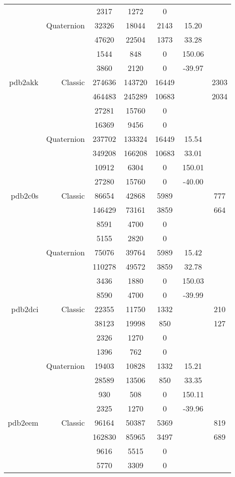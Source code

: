 \begin{xltabular}{\textwidth}{r|rcccSc}
& & 2317 & 1272 & 0 & & \\
& Quaternion & 32326 & 18044 & 2143 & 15.20 & \\
& & 47620 & 22504 & 1373 & 33.28 & \\
& & 1544 & 848 & 0 & 150.06 & \\
& & 3860 & 2120 & 0 & -39.97 & \\ \addlinespace
pdb2akk & Classic & 274636 & 143720 & 16449 & & 2303 \\
& & 464483 & 245289 & 10683 & & 2034 \\
& & 27281 & 15760 & 0 & & \\
& & 16369 & 9456 & 0 & & \\
& Quaternion & 237702 & 133324 & 16449 & 15.54 & \\
& & 349208 & 166208 & 10683 & 33.01 & \\
& & 10912 & 6304 & 0 & 150.01 & \\
& & 27280 & 15760 & 0 & -40.00 & \\ \addlinespace
pdb2c0s & Classic & 86654 & 42868 & 5989 & & 777 \\
& & 146429 & 73161 & 3859 & & 664 \\
& & 8591 & 4700 & 0 & & \\
& & 5155 & 2820 & 0 & & \\
& Quaternion & 75076 & 39764 & 5989 & 15.42 & \\
& & 110278 & 49572 & 3859 & 32.78 & \\
& & 3436 & 1880 & 0 & 150.03 & \\
& & 8590 & 4700 & 0 & -39.99 & \\ \addlinespace
pdb2dci & Classic & 22355 & 11750 & 1332 & & 210 \\
& & 38123 & 19998 & 850 & & 127 \\
& & 2326 & 1270 & 0 & & \\
& & 1396 & 762 & 0 & & \\
& Quaternion & 19403 & 10828 & 1332 & 15.21 & \\
& & 28589 & 13506 & 850 & 33.35 & \\
& & 930 & 508 & 0 & 150.11 & \\
& & 2325 & 1270 & 0 & -39.96 & \\ \addlinespace
pdb2eem & Classic & 96164 & 50387 & 5369 & & 819 \\
& & 162830 & 85965 & 3497 & & 689 \\
& & 9616 & 5515 & 0 & & \\
& & 5770 & 3309 & 0 & & \\

\end{xltabular}
